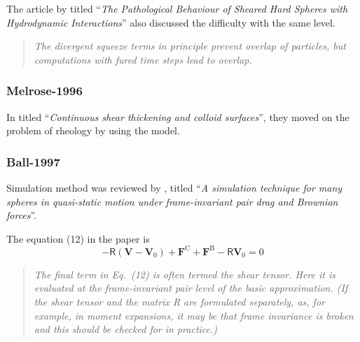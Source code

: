\documentclass[11pt]{scrartcl}
\newcommand{\tens}[1]{\bm{\mathsf{#1}}}
\begin{document}
The article by \citet{Melrose_1995}
titled ``\emph{The Pathological Behaviour of Sheared Hard Spheres with Hydrodynamic Interactions}'' also discussed the difficulty with the same level.

\begin{quote}
\emph{The divergent squeeze terms in principle prevent overlap of particles,
 but computations with fured time steps lead to overlap. }
\end{quote}

\subsubsection*{Melrose-1996}

In \citet{Melrose_1996}
titled ``\emph{Continuous shear thickening and colloid surfaces}'',
they moved on the problem of rheology 
by using the model.  



\subsubsection*{Ball-1997}

Simulation method was reviewed  
by \citet{Ball_1997},
titled 
``\emph{A simulation technique for many spheres 
in quasi-static motion under frame-invariant pair drag and Brownian forces}''.

The equation (12) in the paper is 
\begin{equation}
 - \tens{R} (\bm{V}-\bm{V}_0)
 + \bm{F}^{\mathrm{C}}
 + \bm{F}^{\mathrm{B}}
 - \tens{R} \bm{V}_0 = 0
\end{equation}

\begin{quotation}
\emph{
 The final term in Eq.~(12) is often termed the shear tensor. 
Here it is evaluated at the frame-invariant pair level of the basic approximation. 
(If the shear tensor and the matrix R are formulated separately,
 as, for example, in moment expansions, 
it may be that frame invariance is broken and this should be checked for in practice.)
}
\end{quotation}
\end{document}
